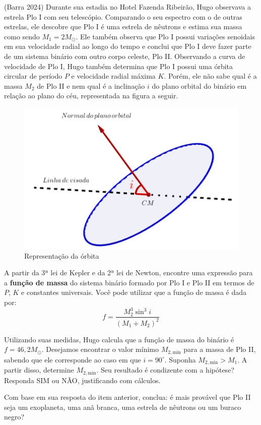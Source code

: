 \documentclass[11pt]{article}
\begin{document}
\begin{pproblem}(Barra 2024) Durante sua estadia no Hotel Fazenda Ribeirão, Hugo observava a estrela Plo I com seu telescópio. Comparando o seu espectro com o de outras estrelas, ele descobre que Plo I é uma estrela de nêutrons e estima sua massa como sendo \( M_1 = 2M_{\odot} \). Ele também observa que Plo I possui variações senoidais em sua velocidade radial ao longo do tempo e conclui que Plo I deve fazer parte de um sistema binário com outro corpo celeste, Plo II. Observando a curva de velocidade de Plo I, Hugo também determina que Plo I possui uma órbita circular de período \( P \) e velocidade radial máxima \( K \). Porém, ele não sabe qual é a massa \( M_2 \) de Plo II e nem qual é a inclinação \( i \) do plano orbital do binário em relação ao plano do céu, representada na figura a seguir.

    \begin{figure}[H]
        \centering
        \includegraphics[width=0.8\linewidth]{imagens/figurabarra.png}
        \caption{Representação da órbita}
    \end{figure}

    \begin{alternativas}
        \item A partir da 3ª lei de Kepler e da 2ª lei de Newton, encontre uma expressão para a \textbf{função de massa} do sistema binário formado por Plo I e Plo II em termos de \( P \), \( K \) e constantes universais. Você pode utilizar que a função de massa é dada por:
        \[
            f = \frac{M_2^3 \sin^3 i}{(M_1 + M_2)^2}
        \]
    
        \item Utilizando suas medidas, Hugo calcula que a função de massa do binário é \( f = 46,2M_{\odot} \). Desejamos encontrar o valor mínimo \( M_{2,\text{min}} \) para a massa de Plo II, sabendo que ele corresponde ao caso em que \( i = 90^\circ \). Suponha \( M_{2,\text{min}} > M_1 \). A partir disso, determine \( M_{2,\text{min}} \). Seu resultado é condizente com a hipótese? Responda SIM ou NÃO, justificando com cálculos.
        
        \item Com base em sua resposta do item anterior, conclua: é mais provável que Plo II seja um exoplaneta, uma anã branca, uma estrela de nêutrons ou um buraco negro?
    \end{alternativas}
\end{pproblem}
\end{document}
